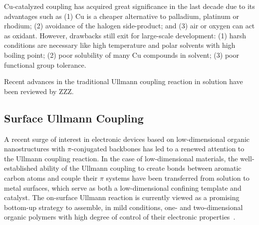 \documentclass[journal=jacsat,manuscript=article]{achemso}
\begin{document}
Cu-catalyzed coupling has acquired great significance in the last decade due to its advantages such as (1) Cu is a cheaper alternative to palladium, platinum or rhodium; (2) avoidance of the halogen side-product; and (3) air or oxygen can act as oxidant. However, drawbacks still exit for large-scale development: (1) harsh conditions are necessary like high temperature and polar solvents with high boiling point; (2) poor solubility of many Cu compounds in solvent; (3) poor functional group tolerance.

Recent advances in the traditional Ullmann coupling reaction in solution have been reviewed by ZZZ. %


\subsection{Surface Ullmann Coupling}

A recent surge of interest in electronic devices based on low-dimensional organic nanostructures with $\pi$-conjugated backbones has led to a renewed attention to the Ullmann coupling reaction. 
In the case of low-dimensional materials, the well-established ability of the Ullmann coupling to create bonds between aromatic carbon atoms and couple their $\pi$ systems have been transferred from solution to metal surfaces, which serve as both a low-dimensional confining template and catalyst. 
The on-surface Ullmann reaction is currently viewed as a promising bottom-up strategy to assemble, in mild conditions, one- and two-dimensional organic polymers with high degree of control of their electronic properties~\cite{RZK-reviews}.
\end{document}
